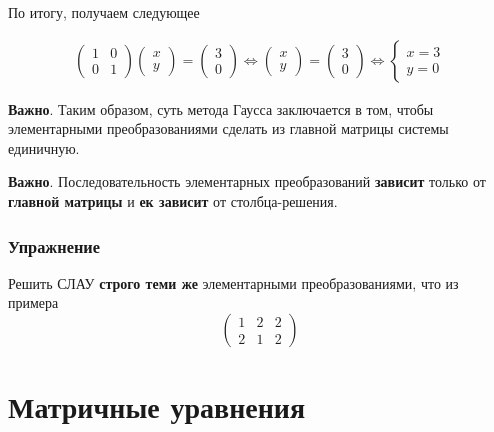 \documentclass[]{article}
\begin{document}
По итогу, получаем следующее

\begin{gather*}
\begin{pmatrix}
	1 & 0 
	\\
	0 & 1 
\end{pmatrix}
\begin{pmatrix}
	x
	\\
	y 
\end{pmatrix}
=
\begin{pmatrix}
	3
	\\
	0 
\end{pmatrix}
\Leftrightarrow
\begin{pmatrix}
	x
	\\
	y 
\end{pmatrix}
=
\begin{pmatrix}
	3
	\\
	0 
\end{pmatrix}
\Leftrightarrow
\begin{cases}
	x=3
	\\
	y=0
\end{cases}
\end{gather*}


\textbf{Важно}. Таким образом, суть метода Гаусса заключается в том, чтобы элементарными преобразованиями сделать из главной матрицы системы единичную.

\textbf{Важно}. Последовательность элементарных преобразований \textbf{зависит} только от \textbf{главной матрицы} и \textbf{ек зависит} от столбца-решения.

\subsubsection{Упражнение}
Решить СЛАУ \textbf{строго теми же} элементарными преобразованиями, что из примера
\begin{equation*}
		\left(
	\begin{array}{ll|l}
		1 & 2 & 2
		\\
		2 & 1 & 2
	\end{array}
	\right)
\end{equation*}

\section{Матричные уравнения}
\end{document}
